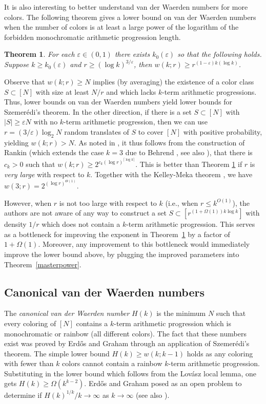 \documentclass[11pt]{article}
\numberwithin{equation}{section}
\newtheorem{thm}{Theorem}
\theoremstyle{definition}
\theoremstyle{remark}
\begin{document}
It is also interesting to better understand van der Waerden numbers for more colors. The following theorem gives a lower bound on van der Waerden numbers when the number of colors is at least a large power of the logarithm of the forbidden monochromatic arithmetic progression length. 


\begin{thm}\label{powervdw}
For each $\varepsilon\in (0,1)$ there exists $k_0(\varepsilon)$ so that the following holds. Suppose $k\ge k_0(\varepsilon)$ and $r\ge (\log k)^{3/\varepsilon}$, then $w(k;r) \geq r^{(1-\varepsilon) k(\log k)}$.
\end{thm}

\noindent Observe that $w(k;r)\ge N$ implies (by averaging) the existence of a color class $S\subset [N]$ with size at least $N/r$ and which lacks $k$-term arithmetic progressions. Thus, lower bounds on  van der Waerden numbers yield lower bounds for Szemer\'edi's theorem. In the other direction, if there is a set $S\subset [N]$ with $|S| \geq \varepsilon N$ with no $k$-term arithmetic progression, then we can use $r=(3/\varepsilon)\log_2 N$ random translates of $S$ to cover $[N]$ with positive probability, yielding $w(k;r) > N$. As noted in \cite{BLR}, it thus follows from the construction of Rankin \cite{Rankin} (which extends the case $k=3$ due to Behrend \cite{Behrend}, see also \cite{EHPS}), that there is $c_k>0$ such that $w(k;r) \geq 2^{c_k(\log r)^{\lceil \log k \rceil}}$. This is better than Theorem \ref{powervdw} if $r$ is {\it very large} with respect to $k$. Together with the Kelley-Meka theorem \cite{KM}, we have $w(3;r) = 2^{(\log r)^{\Theta(1)}}$.

However, when $r$ is not too large with respect to $k$ (i.e., when $r\le k^{O(1)}$), the authors are not aware of any way to construct a set $S\subset [r^{(1+\Omega(1))k\log k}]$ with density $1/r$ which does not contain a $k$-term arithmetic progression. This serves as a bottleneck for improving the exponent in Theorem~\ref{powervdw} by a factor of $1+\Omega(1)$. Moreover, any improvement to this bottleneck would immediately improve the lower bound above, by plugging the improved parameters into Theorem~\ref{masterpower}. 

\subsection{Canonical van der Waerden numbers} 

The {\it canonical van der Waerden number} $H(k)$ is the minimum $N$ such that every coloring of $[N]$ contains a $k$-term arithmetic progression which is monochromatic or rainbow (all different colors). The fact that these numbers exist was proved by Erd\H{o}s and Graham \cite{erdosgraham} through an application of Szemer\'edi's theorem. The  simple lower bound $H(k) \geq w(k;k-1)$ holds as any coloring with fewer than $k$ colors cannot contain a rainbow $k$-term arithmetic progression. Substituting in the lower bound which follows from the Lov\'asz local lemma, one gets $H(k) \geq \Omega(k^{k-2})$. Erd\H{o}s and Graham \cite{erdosgraham} posed as an open problem to determine if $H(k)^{1/k}/k \to \infty$ as $k \to \infty$ (see also \cite{bloom176}). 
\end{document}

